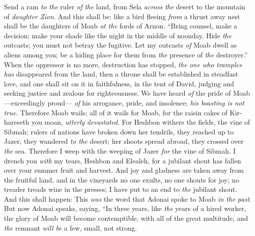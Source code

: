 \begin{biblechapter} %
\verse Send a ram \textit{to the} ruler \textit{of the} land, 
from Sela \textit{across the} desert to the mountain of \textit{daughter Zion}.
\verse And this shall be:
\verse like a bird fleeing \textit{from} a thrust away nest 
shall be the daughters of Moab \textit{at the} fords of Arnon.
\verse “Bring counsel, 
make a decision; 
make your shade like the night 
in the middle of noonday. 
Hide \textit{the} outcasts; 
you must not betray the fugitive.
\verse Let my outcasts \textit{of} Moab dwell as aliens among you; 
be a hiding place for them from \textit{the} presence of \textit{the} destroyer.” 
When the oppressor is no more, destruction has stopped, 
\textit{the} \textit{one who tramples has} disappeared from the land,
\verse then a throne shall be established in steadfast love, 
and one shall sit on it in faithfulness, in the tent of David, 
judging and seeking justice 
and zealous for righteousness.
\verse We have heard \textit{of} the pride of Moab—exceedingly proud— 
\textit{of} his arrogance, pride, and insolence; \textit{his boasting is not true}.
\verse Therefore Moab wails; 
all of it wails for Moab, 
for the raisin cakes of Kir-hareseth you moan, \textit{utterly devastated}.
\verse For Heshbon withers the fields, the vine of Sibmah; 
rulers of nations have broken down her tendrils, 
they reached up to Jazer, 
they wandered \textit{to the} desert; 
her shoots spread abroad, 
they crossed over \textit{the} sea.
\verse Therefore I weep with the weeping of Jazer \textit{for} the vine of Sibmah. 
I drench you \textit{with} my tears, Heshbon and Elealeh, 
for a jubilant shout has fallen over your summer fruit and harvest.
\verse And joy and gladness are taken away from the fruitful land, 
and in the vineyards no one exults, 
no one shouts for joy; 
no treader treads wine in the presses; 
I have put to an end to \textit{the} jubilant shout.
\verse And this shall happen:
\verse This \textit{was} the word that Adonai spoke to Moab \textit{in the past}.
\verse But now Adonai speaks, saying, “In three years, like \textit{the} years of a hired worker, the glory of Moab will become contemptible, with all of the great multitude, and \textit{the} remnant \textit{will be} a few, small, not strong.
\end{biblechapter}

